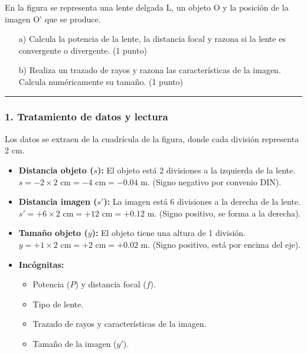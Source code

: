 \begin{cajaenunciado}
En la figura se representa una lente delgada L, un objeto O y la posición de la imagen O' que se produce.
\begin{enumerate}
    \item[a)] Calcula la potencia de la lente, la distancia focal y razona si la lente es convergente o divergente. (1 punto)
    \item[b)] Realiza un trazado de rayos y razona las características de la imagen. Calcula numéricamente su tamaño. (1 punto)
\end{enumerate}
\end{cajaenunciado}
\hrule

\subsubsection*{1. Tratamiento de datos y lectura}
Los datos se extraen de la cuadrícula de la figura, donde cada división representa 2 cm.
\begin{itemize}
    \item \textbf{Distancia objeto ($s$):} El objeto está 2 divisiones a la izquierda de la lente. $s = -2 \times 2 \text{ cm} = -4 \text{ cm} = -0.04 \text{ m}$. (Signo negativo por convenio DIN).
    \item \textbf{Distancia imagen ($s'$):} La imagen está 6 divisiones a la derecha de la lente. $s' = +6 \times 2 \text{ cm} = +12 \text{ cm} = +0.12 \text{ m}$. (Signo positivo, se forma a la derecha).
    \item \textbf{Tamaño objeto ($y$):} El objeto tiene una altura de 1 división. $y = +1 \times 2 \text{ cm} = +2 \text{ cm} = +0.02 \text{ m}$. (Signo positivo, está por encima del eje).
    \item \textbf{Incógnitas:}
    \begin{itemize}
        \item Potencia ($P$) y distancia focal ($f$).
        \item Tipo de lente.
        \item Trazado de rayos y características de la imagen.
        \item Tamaño de la imagen ($y'$).
    \end{itemize}
\end{itemize}


